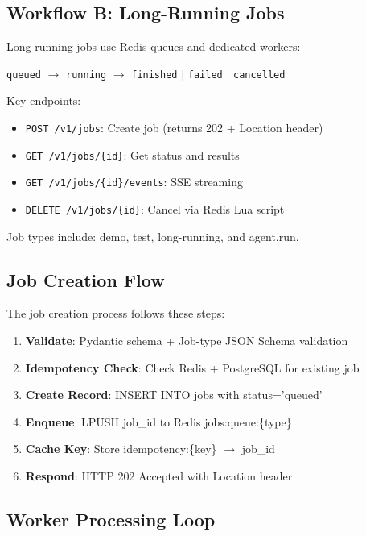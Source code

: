 \documentclass[a4paper,twoside]{sapthesis}
\begin{document}
\subsection{Workflow B: Long-Running Jobs}
\label{subsec:workflow-b}

Long-running jobs use Redis queues and dedicated workers:

\begin{center}
\texttt{queued} $\rightarrow$ \texttt{running} $\rightarrow$ \texttt{finished} $|$ \texttt{failed} $|$ \texttt{cancelled}
\end{center}

Key endpoints:
\begin{itemize}
    \item \texttt{POST /v1/jobs}: Create job (returns 202 + Location header)
    \item \texttt{GET /v1/jobs/\{id\}}: Get status and results
    \item \texttt{GET /v1/jobs/\{id\}/events}: SSE streaming
    \item \texttt{DELETE /v1/jobs/\{id\}}: Cancel via Redis Lua script
\end{itemize}

Job types include: demo, test, long-running, and agent.run.

\subsection{Job Creation Flow}
\label{subsec:job-creation-flow}

The job creation process follows these steps:

\begin{enumerate}
    \item \textbf{Validate}: Pydantic schema + Job-type JSON Schema validation
    \item \textbf{Idempotency Check}: Check Redis + PostgreSQL for existing job
    \item \textbf{Create Record}: INSERT INTO jobs with status='queued'
    \item \textbf{Enqueue}: LPUSH job\_id to Redis jobs:queue:\{type\}
    \item \textbf{Cache Key}: Store idempotency:\{key\} $\rightarrow$ job\_id
    \item \textbf{Respond}: HTTP 202 Accepted with Location header
\end{enumerate}

\subsection{Worker Processing Loop}
\label{subsec:worker-processing}
\end{document}
